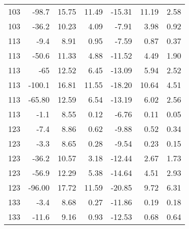 \begin{table}[H]
\begin{tabular}{|r|r|r|r|r|r|r|}
           103 &      -98.7 &      15.75 &      11.49 &     -15.31 &      11.19 &       2.58 \\
    
           103 &      -36.2 &      10.23 &       4.09 &      -7.91 &       3.98 &       0.92 \\
    \hline
           113 &       -9.4 &       8.91 &       0.95 &      -7.59 &       0.87 &       0.37 \\
    
           113 &      -50.6 &      11.33 &       4.88 &     -11.52 &       4.49 &       1.90 \\
    
           113 &        -65 &      12.52 &       6.45 &     -13.09 &       5.94 &       2.52 \\
    
           113 &     -100.1 &      16.81 &      11.55 &     -18.20 &      10.64 &       4.51 \\
    
           113 &     -65.80 &      12.59 &       6.54 &     -13.19 &       6.02 &       2.56 \\
    
           113 &       -1.1 &       8.55 &       0.12 &      -6.76 &       0.11 &       0.05 \\
    \hline
           123 &       -7.4 &       8.86 &       0.62 &      -9.88 &       0.52 &       0.34 \\
    
           123 &       -3.3 &       8.65 &       0.28 &      -9.54 &       0.23 &       0.15 \\
    
           123 &      -36.2 &      10.57 &       3.18 &     -12.44 &       2.67 &       1.73 \\
    
           123 &      -56.9 &      12.29 &       5.38 &     -14.64 &       4.51 &       2.93 \\
    
           123 &     -96.00 &      17.72 &      11.59 &     -20.85 &       9.72 &       6.31 \\
    \hline
           133 &       -3.4 &       8.68 &       0.27 &     -11.86 &       0.19 &       0.18 \\
    
           133 &      -11.6 &       9.16 &       0.93 &     -12.53 &       0.68 &       0.64 \\
    

\end{tabular}
\end{table}
